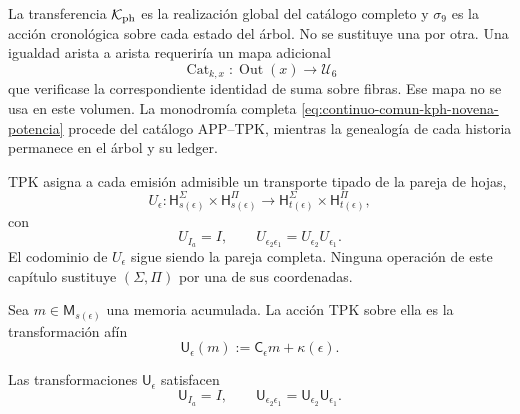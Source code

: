 \begin{remark}
\label{rem:continuo-comun-kph-no-identificacion-aristas}
La transferencia \(\mathcal K_{\rm ph}\) es la realización global del
catálogo completo y \(\sigma_9\) es la acción cronológica sobre cada estado
del árbol. No se sustituye una por otra. Una igualdad arista a arista
requeriría un mapa adicional
\[
 \operatorname{Cat}_{k,x}:\operatorname{Out}(x)\longrightarrow\mathcal U_6
\]
que verificase la correspondiente identidad de suma sobre fibras. Ese mapa
no se usa en este volumen. La monodromía completa
\eqref{eq:continuo-comun-kph-novena-potencia} procede del catálogo
APP--TPK, mientras la genealogía de cada historia permanece en el árbol y
su ledger.
\end{remark}

TPK asigna a cada emisión admisible un transporte tipado de la pareja de
hojas,
\begin{equation}
\label{eq:continuo-comun-transporte-hojas}
 U_\epsilon:
 \mathsf H_{s(\epsilon)}^{\Sigma}\times
 \mathsf H_{s(\epsilon)}^{\Pi}
 \longrightarrow
 \mathsf H_{t(\epsilon)}^{\Sigma}\times
 \mathsf H_{t(\epsilon)}^{\Pi},
\end{equation}
con
\begin{equation}
\label{eq:continuo-comun-transporte-hojas-funtorial}
 U_{I_a}=I,
 \qquad
 U_{\epsilon_2\epsilon_1}=U_{\epsilon_2}U_{\epsilon_1}.
\end{equation}
El codominio de \(U_\epsilon\) sigue siendo la pareja completa.  Ninguna
operación de este capítulo sustituye
\((\Sigma,\Pi)\) por una de sus coordenadas.

Sea \(m\in\mathsf M_{s(\epsilon)}\) una memoria acumulada.  La acción TPK
sobre ella es la transformación afín
\begin{equation}
\label{eq:continuo-comun-accion-memoria}
 \mathsf U_\epsilon(m)
 :=\mathsf C_\epsilon m+\kappa(\epsilon).
\end{equation}

\begin{lemma}
\label{lem:continuo-comun-accion-memoria}
Las transformaciones \(\mathsf U_\epsilon\) satisfacen
\begin{equation}
\label{eq:continuo-comun-accion-memoria-composicion}
 \mathsf U_{I_a}=I,
 \qquad
 \mathsf U_{\epsilon_2\epsilon_1}
 =\mathsf U_{\epsilon_2}\mathsf U_{\epsilon_1}.
\end{equation}
\end{lemma}

